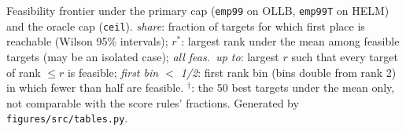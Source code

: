 \documentclass{article}
\begin{document}
\begin{table}[t]
\caption{Feasibility frontier under the primary cap (\texttt{emp99} on OLLB, \texttt{emp99T} on HELM) and the oracle cap (\texttt{ceil}). \emph{share}: fraction of targets for which first place is reachable (Wilson 95\% intervals); $r^*$: largest rank under the mean among feasible targets (may be an isolated case); \emph{all feas.\ up to}: largest $r$ such that every target of rank $\le r$ is feasible; \emph{first bin $<$ 1/2}: first rank bin (bins double from rank 2) in which fewer than half are feasible. $^\dagger$: the 50 best targets under the mean only, not comparable with the score rules' fractions. Generated by \texttt{figures/src/tables.py}.}
\label{tab:T4}
\centering\scriptsize
\resizebox{\linewidth}{!}{}\\[4pt]
\resizebox{\linewidth}{!}{}
\end{table}
\end{document}
